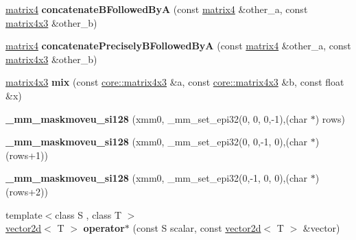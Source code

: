 \begin{DoxyCompactItemize}
\item 
\hyperlink{namespaceirr_1_1core_a73fa92e638c5ca97efd72da307cc9b65}{matrix4} {\bfseries concatenate\+B\+Followed\+ByA} (const \hyperlink{namespaceirr_1_1core_a73fa92e638c5ca97efd72da307cc9b65}{matrix4} \&other\+\_\+a, const \hyperlink{classirr_1_1core_1_1matrix4x3}{matrix4x3} \&other\+\_\+b)\hypertarget{namespaceirr_1_1core_a2b539f16db54f50d4307977f74fd1c25}{}\label{namespaceirr_1_1core_a2b539f16db54f50d4307977f74fd1c25}

\item 
\hyperlink{namespaceirr_1_1core_a73fa92e638c5ca97efd72da307cc9b65}{matrix4} {\bfseries concatenate\+Precisely\+B\+Followed\+ByA} (const \hyperlink{namespaceirr_1_1core_a73fa92e638c5ca97efd72da307cc9b65}{matrix4} \&other\+\_\+a, const \hyperlink{classirr_1_1core_1_1matrix4x3}{matrix4x3} \&other\+\_\+b)\hypertarget{namespaceirr_1_1core_aaacc71f9b25e9d99b6313a84a7151b8a}{}\label{namespaceirr_1_1core_aaacc71f9b25e9d99b6313a84a7151b8a}

\item 
\hyperlink{classirr_1_1core_1_1matrix4x3}{matrix4x3} {\bfseries mix} (const \hyperlink{classirr_1_1core_1_1matrix4x3}{core\+::matrix4x3} \&a, const \hyperlink{classirr_1_1core_1_1matrix4x3}{core\+::matrix4x3} \&b, const float \&x)\hypertarget{namespaceirr_1_1core_a9d4576678061975ef0072912136e7fe4}{}\label{namespaceirr_1_1core_a9d4576678061975ef0072912136e7fe4}

\item 
{\bfseries \+\_\+mm\+\_\+maskmoveu\+\_\+si128} (xmm0, \+\_\+mm\+\_\+set\+\_\+epi32(0, 0, 0,-\/1),(char $\ast$) rows)\hypertarget{namespaceirr_1_1core_a20465f5da0f8c3738ed1a6475f8ae4f9}{}\label{namespaceirr_1_1core_a20465f5da0f8c3738ed1a6475f8ae4f9}

\item 
{\bfseries \+\_\+mm\+\_\+maskmoveu\+\_\+si128} (xmm0, \+\_\+mm\+\_\+set\+\_\+epi32(0, 0,-\/1, 0),(char $\ast$)(rows+1))\hypertarget{namespaceirr_1_1core_ad987f34c857a8e0a79c5debaa6369b8a}{}\label{namespaceirr_1_1core_ad987f34c857a8e0a79c5debaa6369b8a}

\item 
{\bfseries \+\_\+mm\+\_\+maskmoveu\+\_\+si128} (xmm0, \+\_\+mm\+\_\+set\+\_\+epi32(0,-\/1, 0, 0),(char $\ast$)(rows+2))\hypertarget{namespaceirr_1_1core_a1d22f4a7c76015e8afddfe0c949ea2f5}{}\label{namespaceirr_1_1core_a1d22f4a7c76015e8afddfe0c949ea2f5}

\item 
{\footnotesize template$<$class S , class T $>$ }\\\hyperlink{classirr_1_1core_1_1vector2d}{vector2d}$<$ T $>$ {\bfseries operator$\ast$} (const S scalar, const \hyperlink{classirr_1_1core_1_1vector2d}{vector2d}$<$ T $>$ \&vector)\hypertarget{namespaceirr_1_1core_a2bf9362df9cfbfb4c02a8f5514858cff}{}\label{namespaceirr_1_1core_a2bf9362df9cfbfb4c02a8f5514858cff}


\end{DoxyCompactItemize}
